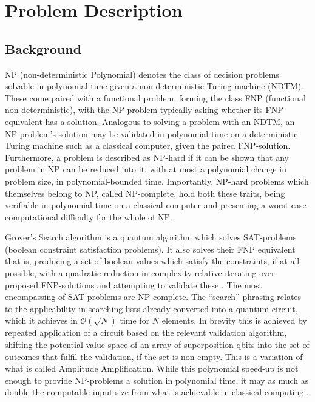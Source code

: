 \documentclass[msc,lith,english]{liuthesis}
\author{\parbox{\textwidth}{Emil Segerbäck\\ Olav Övrebö}}
\begin{document}
\chapter{Problem Description}
\section{Background}
NP (non-deterministic Polynomial) denotes the class of decision problems solvable in polynomial time given a non-deterministic Turing machine (NDTM). These come paired with a functional problem, forming the class FNP (functional non-deterministic), with the NP problem typically asking whether its FNP equivalent has a solution. Analogous to solving a problem with an NDTM, an NP-problem's solution may be validated in polynomial time on a deterministic Turing machine such as a classical computer, given the paired FNP-solution. Furthermore, a problem is described as NP-hard if it can be shown that any problem in NP can be reduced into it, with at most a polynomial change in problem size, in polynomial-bounded time. Importantly, NP-hard problems which themselves belong to NP, called NP-complete, hold both these traits, being verifiable in polynomial time on a classical computer and presenting a worst-case computational difficulty for the whole of NP \cite{CCAMA}.

Grover’s Search algorithm is a quantum algorithm which solves SAT-problems (boolean constraint satisfaction problems). It also solves their FNP equivalent that is, producing a set of boolean values which satisfy the constraints, if at all possible, with a quadratic reduction in complexity relative iterating over proposed FNP-solutions and attempting to validate these \cite{QCQI}\cite{CCAMA}. The most encompassing of SAT-problems are NP-complete. The “search” phrasing relates to the applicability in searching lists already converted into a quantum circuit, which it achieves in $\mathcal{O}(\sqrt{N})$ time for $N$ elements. In brevity this is achieved by repeated application of a circuit based on the relevant validation algorithm, shifting the potential value space of an array of superposition qbits into the set of outcomes that fulfil the validation, if the set is non-empty. This is a variation of what is called Amplitude Amplification. While this polynomial speed-up is not enough to provide NP-problems a solution in polynomial time, it may as much as double the computable input size from what is achievable in classical computing \cite{EIQC}.
\end{document}
